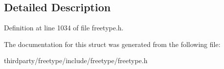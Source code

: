 \subsection{Detailed Description}


Definition at line 1034 of file freetype.\+h.



The documentation for this struct was generated from the following file\+:\begin{DoxyCompactItemize}
\item 
thirdparty/freetype/include/freetype/freetype.\+h\end{DoxyCompactItemize}
